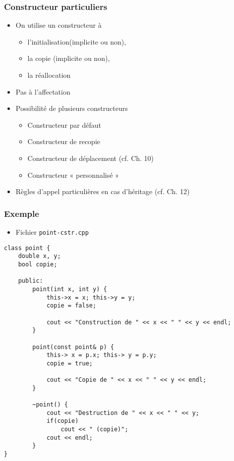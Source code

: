 \begin{frame}
\frametitle{Constructeur particuliers}
\begin{itemize}[<+->]
\item On utilise un constructeur à
	\begin{itemize}
	\item l'initialisation(implicite ou non),
	\item la copie (implicite ou non),
	\item la réallocation
	\end{itemize}
\item Pas à l'affectation
\item Possibilité de plusieurs constructeurs
	\begin{itemize}
	\item Constructeur par défaut
	\item Constructeur de recopie
	\item Constructeur de déplacement (cf. Ch. 10)
	\item Constructeur « personnalisé »
	\end{itemize}
\item Règles d'appel particulières en cas d'héritage (cf. Ch. 12)
\end{itemize}
\end{frame}

\begin{frame}[containsverbatim]
\frametitle{Exemple}
\begin{itemize}
\item Fichier \texttt{point-cstr.cpp}
\end{itemize}
\begin{lstlisting}
class point {
	double x, y;
	bool copie;

	public:
		point(int x, int y) {
			this->x = x; this->y = y;
			copie = false;
		
			cout << "Construction de " << x << " " << y << endl;
		}

		point(const point& p) {
			this-> x = p.x; this-> y = p.y;
			copie = true;
		
			cout << "Copie de " << x << " " << y << endl;
		}	

		~point() {
			cout << "Destruction de " << x << " " << y;
			if(copie)
				cout << " (copie)";
			cout << endl;
		}
}
\end{lstlisting}
\end{frame}

